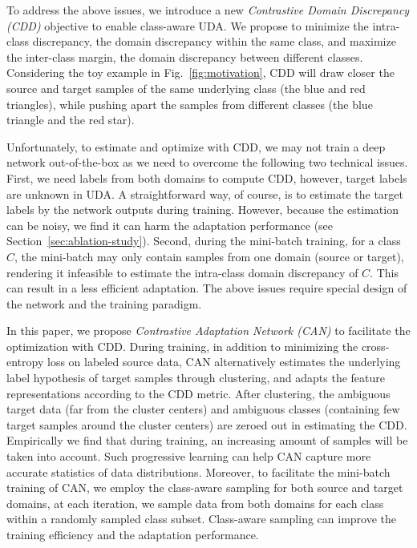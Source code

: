 \documentclass[10pt,twocolumn,letterpaper]{article}
\begin{document}
To address the above issues, we introduce a new \emph{Contrastive Domain Discrepancy (CDD)} objective to enable class-aware UDA. 
We propose to minimize the intra-class discrepancy, \ie the domain discrepancy within the same class, and maximize the inter-class margin, \ie the domain discrepancy between different classes.
Considering the toy example in Fig.~\ref{fig:motivation}, CDD will draw closer the source and target samples of the same underlying class (\eg the blue and red triangles), while 
pushing apart the samples from different classes (\eg the blue triangle and the red star).


Unfortunately, to estimate and optimize with CDD, we may not train a deep network out-of-the-box as we need to overcome the following two technical issues.
First, we need labels from both domains to compute CDD, however, target labels are unknown in UDA.
A straightforward way, of course, is to estimate the target labels by the network outputs during training.
However, because the estimation can be noisy, we find it can harm the adaptation performance (see Section~\ref{sec:ablation-study}).
Second, during the mini-batch training, 
for a class $C$, the mini-batch may only contain samples from one domain (source or target), 
rendering it infeasible to estimate the intra-class domain discrepancy of $C$. 
This can result in a less efficient adaptation.
The above issues require special design of the network and the training paradigm.

In this paper, we propose \emph{Contrastive Adaptation Network (CAN)} 
to facilitate the optimization with CDD. 
During training, in addition to minimizing the cross-entropy loss on labeled source data,
CAN alternatively estimates the underlying label hypothesis of target samples through clustering, 
and adapts the feature representations according to the CDD metric.
After clustering,
the ambiguous target data (\ie far from the cluster centers) 
and ambiguous classes (\ie containing few target samples around the cluster centers) 
are zeroed out in estimating the CDD.
Empirically we find that during training, 
an increasing amount of samples will be taken into account.
Such progressive learning can help CAN capture more accurate statistics of data distributions. Moreover, to facilitate the mini-batch training of CAN, 
we employ the class-aware sampling for both source and target domains,
\ie at each iteration, we sample data from both domains for each class within a randomly sampled class subset. Class-aware sampling can improve the training efficiency and the adaptation performance.
\end{document}
